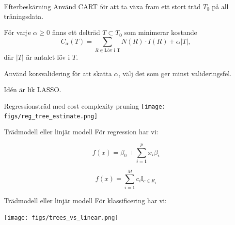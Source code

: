 \documentclass[10pt,english]{beamer}
\begin{document}
\begin{frame}{Efterbeskärning}
    Använd CART för att ta växa fram ett stort träd $T_0$ på all träningsdata.

    För varje $\alpha \geq 0$ finns ett delträd $T \subset T_0$ som minimerar kostande
    \begin{equation*}
        C_{\alpha}(T) = \sum_{R \in \text{Löv i T}} N(R) \cdot I(R) + \alpha |T|,
    \end{equation*} 
    där $|T|$ är antalet löv i $T$.

    Använd korsvalidering för att skatta $\alpha$, välj det som ger minst valideringsfel.

    Idén är lik LASSO.
\end{frame}

\begin{frame}{Regressionsträd med cost complexity pruning}
    \texttt{[image: figs/reg\_tree\_estimate.png]}
\end{frame}

\begin{frame}{Trädmodell eller linjär modell}
    För regression har vi:

    \begin{equation*}
        f(x) = \beta_0 + \sum_{i=1}^{p} x_i \beta_i
    \end{equation*}

    \begin{equation*}
        f(x) = \sum_{i=1}^{M}c_i \mathbb{I}_{c \in R_i}
    \end{equation*}
\end{frame}

\begin{frame}{Trädmodell eller linjär modell}
    För klassificering har vi:

    \texttt{[image: figs/trees\_vs\_linear.png]}

\end{frame}
\end{document}
